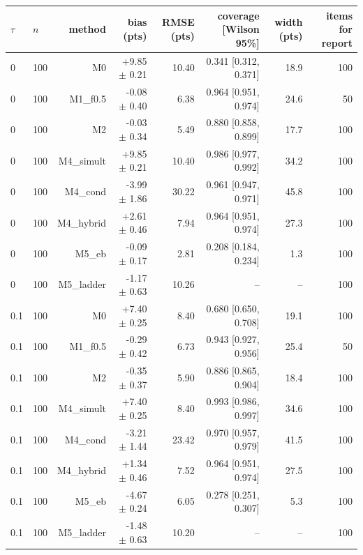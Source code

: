 \begin{tabular}{llrrrrrr}
\toprule
$\tau$ & $n$ & method & bias (pts) & RMSE (pts) & coverage [Wilson 95\%] & width (pts) & items for report \\
\midrule
0 & 100 & M0 & +9.85 $\pm$ 0.21 & 10.40 & 0.341 [0.312, 0.371] & 18.9 & 100 \\
0 & 100 & M1\_f0.5 & -0.08 $\pm$ 0.40 & 6.38 & 0.964 [0.951, 0.974] & 24.6 & 50 \\
0 & 100 & M2 & -0.03 $\pm$ 0.34 & 5.49 & 0.880 [0.858, 0.899] & 17.7 & 100 \\
0 & 100 & M4\_simult & +9.85 $\pm$ 0.21 & 10.40 & 0.986 [0.977, 0.992] & 34.2 & 100 \\
0 & 100 & M4\_cond & -3.99 $\pm$ 1.86 & 30.22 & 0.961 [0.947, 0.971] & 45.8 & 100 \\
0 & 100 & M4\_hybrid & +2.61 $\pm$ 0.46 & 7.94 & 0.964 [0.951, 0.974] & 27.3 & 100 \\
0 & 100 & M5\_eb & -0.09 $\pm$ 0.17 & 2.81 & 0.208 [0.184, 0.234] & 1.3 & 100 \\
0 & 100 & M5\_ladder & -1.17 $\pm$ 0.63 & 10.26 & -- & -- & 100 \\
\midrule
0.1 & 100 & M0 & +7.40 $\pm$ 0.25 & 8.40 & 0.680 [0.650, 0.708] & 19.1 & 100 \\
0.1 & 100 & M1\_f0.5 & -0.29 $\pm$ 0.42 & 6.73 & 0.943 [0.927, 0.956] & 25.4 & 50 \\
0.1 & 100 & M2 & -0.35 $\pm$ 0.37 & 5.90 & 0.886 [0.865, 0.904] & 18.4 & 100 \\
0.1 & 100 & M4\_simult & +7.40 $\pm$ 0.25 & 8.40 & 0.993 [0.986, 0.997] & 34.6 & 100 \\
0.1 & 100 & M4\_cond & -3.21 $\pm$ 1.44 & 23.42 & 0.970 [0.957, 0.979] & 41.5 & 100 \\
0.1 & 100 & M4\_hybrid & +1.34 $\pm$ 0.46 & 7.52 & 0.964 [0.951, 0.974] & 27.5 & 100 \\
0.1 & 100 & M5\_eb & -4.67 $\pm$ 0.24 & 6.05 & 0.278 [0.251, 0.307] & 5.3 & 100 \\
0.1 & 100 & M5\_ladder & -1.48 $\pm$ 0.63 & 10.20 & -- & -- & 100 \\
\bottomrule
\end{tabular}
